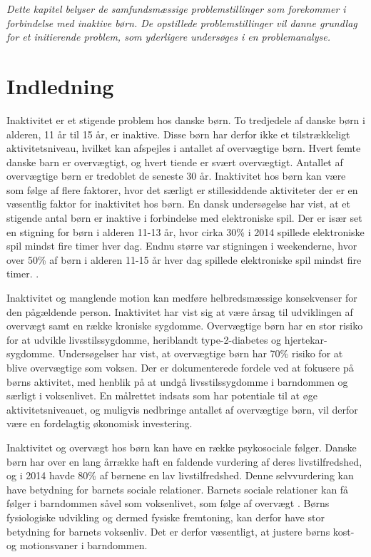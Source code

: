 \textit{Dette kapitel belyser de samfundsmæssige problemstillinger som forekommer i forbindelse med inaktive børn. De opstillede problemstillinger vil danne grundlag for et initierende problem, som yderligere undersøges i en problemanalyse.}

\section{Indledning}
Inaktivitet er et stigende problem hos danske børn. To tredjedele af danske børn i alderen, 11 år til 15 år, er inaktive\citep{SundhedsstyrrelsenFaktaark}. Disse børn har derfor ikke et tilstrækkeligt aktivitetsniveau, hvilket kan  afspejles i antallet af overvægtige børn. Hvert femte danske barn er overvægtigt, og hvert tiende er svært overvægtigt.\citep{Universitet2014} Antallet af overvægtige børn er tredoblet de seneste 30 år\citep{Vindum2012}. Inaktivitet hos børn kan være som følge af flere faktorer, hvor det særligt er stillesiddende aktiviteter der er en væsentlig faktor for inaktivitet hos børn. En dansk undersøgelse har vist, at et stigende antal børn er inaktive i forbindelse med elektroniske spil. Der er især set en stigning for børn i alderen 11-13 år, hvor cirka 30\% i 2014 spillede elektroniske spil mindst fire timer hver dag. Endnu større var stigningen i weekenderne, hvor over 50\% af børn i alderen 11-15 år hver dag spillede elektroniske spil mindst fire timer. \citep{Universitet2014}. 

Inaktivitet og manglende motion kan medføre helbredsmæssige konsekvenser for den pågældende person. Inaktivitet har vist sig at være årsag til udviklingen af overvægt samt en række kroniske sygdomme. Overvægtige børn har en stor risiko for at udvikle livsstilssygdomme, heriblandt type-2-diabetes og hjertekar-sygdomme. Undersøgelser har vist, at overvægtige børn har 70\% risiko for at blive overvægtige som voksen.\citep{Reilly2006} Der er dokumenterede fordele ved at fokusere på børns aktivitet, med henblik på at undgå livsstilssygdomme i barndommen og særligt i voksenlivet. En målrettet indsats som har potentiale til at øge aktivitetsniveauet, og muligvis nedbringe antallet af overvægtige børn, vil derfor være en fordelagtig økonomisk investering\citep{COWI2015}.

Inaktivitet og overvægt hos børn kan have en række psykosociale følger. Danske børn har over en lang årrække haft en faldende vurdering af deres livstilfredshed, og i 2014 havde 80\% af børnene en lav livstilfredshed\citep{Universitet2014}. Denne selvvurdering kan have betydning for barnets sociale relationer. Barnets sociale relationer kan få følger i barndommen såvel som voksenlivet, som følge af overvægt \citep{StatensInstitutforFolkesundhed2007}. \newline
Børns fysiologiske udvikling og dermed fysiske fremtoning, kan derfor have stor betydning for barnets voksenliv. Det er derfor væsentligt, at justere børns kost- og motionsvaner i barndommen. \newpage

